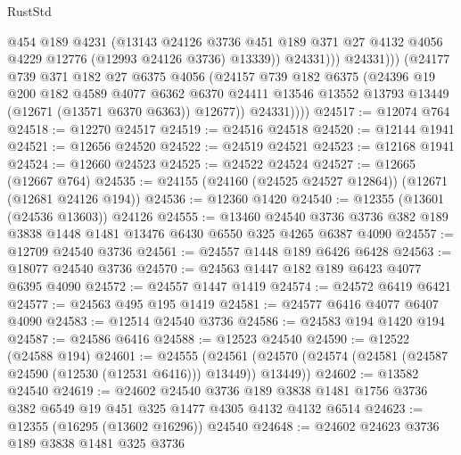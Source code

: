 \begin{lexlean}{RustStd}
\begin{coremodule}
                        @454
                        @189
                        @4231
                        (@13143
                          @24126
                          @3736
                          @451
                          @189
                          @371
                          @27
                          @4132
                          @4056
                          @4229
                          @12776
                          (@12993 @24126 @3736)
                          @13339))
                      @24331)))
                @24331)))
          (@24177
            @739
            @371
            @182
            @27
            @6375
            @4056
            (@24157
              @739
              @182
              @6375
              (@24396
                @19
                @200
                @182
                @4589
                @4077
                @6362
                @6370
                @24411
                @13546
                @13552
                @13793
                @13449
                (@12671 (@13571 @6370 @6363))
                @12677))
            @24331))))
@24517 := @12074 @764
@24518 := @12270 @24517
@24519 := @24516 @24518
@24520 := @12144 @1941
@24521 := @12656 @24520
@24522 := @24519 @24521
@24523 := @12168 @1941
@24524 := @12660 @24523
@24525 := @24522 @24524
@24527 := @12665 (@12667 @764)
@24535 := @24155 (@24160 (@24525 @24527 @12864)) (@12671 (@12681 @24126 @194))
@24536 := @12360 @1420
@24540 := @12355 (@13601 (@24536 @13603)) @24126
@24555 := @13460
    @24540
    @3736
    @3736
    @382
    @189
    @3838
    @1448
    @1481
    @13476
    @6430
    @6550
    @325
    @4265
    @6387
    @4090
@24557 := @12709 @24540 @3736
@24561 := @24557 @1448 @189 @6426 @6428
@24563 := @18077 @24540 @3736
@24570 := @24563 @1447 @182 @189 @6423 @4077 @6395 @4090
@24572 := @24557 @1447 @1419
@24574 := @24572 @6419 @6421
@24577 := @24563 @495 @195 @1419
@24581 := @24577 @6416 @4077 @6407 @4090
@24583 := @12514 @24540 @3736
@24586 := @24583 @194 @1420 @194
@24587 := @24586 @6416
@24588 := @12523 @24540
@24590 := @12522 (@24588 @194)
@24601 := @24555
    (@24561 (@24570 (@24574 (@24581 (@24587 @24590 (@12530 (@12531 @6416))) @13449)) @13449))
@24602 := @13582 @24540
@24619 := @24602
    @24540
    @3736
    @189
    @3838
    @1481
    @1756
    @3736
    @382
    @6549
    @19
    @451
    @325
    @1477
    @4305
    @4132
    @4132
    @6514
@24623 := @12355 (@16295 (@13602 @16296)) @24540
@24648 := @24602
    @24623
    @3736
    @189
    @3838
    @1481
    @325
    @3736

\end{coremodule}
\end{lexlean}
